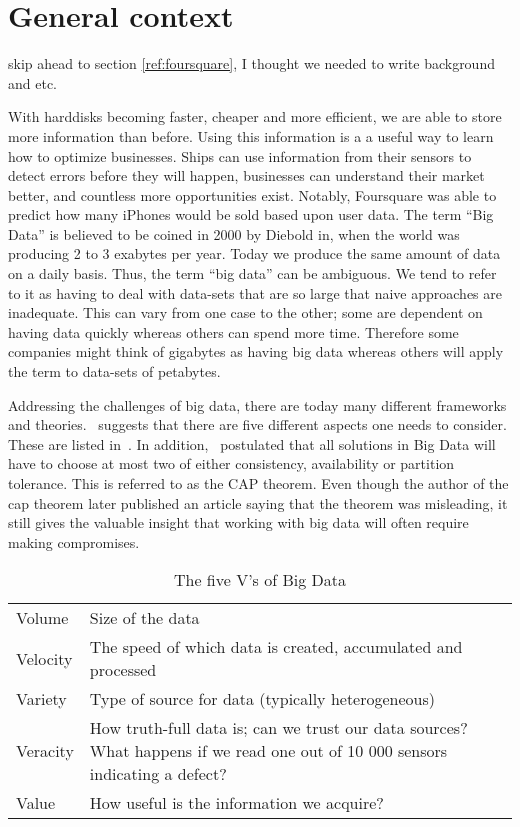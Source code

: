 \section{General context}
\huge skip ahead to section \cref{ref:foursquare}, I thought we needed to write background and etc.
\normalsize
\newline
{\color{blue}
With harddisks becoming faster, cheaper and more efficient, we are able to store more information than before. Using this information is a a useful way to learn how to optimize businesses. Ships can use information
from their sensors to detect errors before they will happen, businesses can understand their market better, and countless more opportunities exist. Notably, Foursquare was able to predict how many iPhones would be sold based upon user data\cite{predictFoursquare}. The term ``Big Data'' is believed to be coined in 2000 by Diebold in\cite{HistoryOfBigData}, when the world was producing 2 to 3 exabytes per year. Today we produce the same amount of data on a daily basis. Thus, the term ``big data'' can be ambiguous. We tend to refer to it as having to deal with data-sets that are so large that naive approaches are inadequate. This can vary from one case to the other; some are dependent on having data quickly whereas others can spend more time. Therefore some companies might think of gigabytes as having big data whereas others will apply the term to data-sets of petabytes. 

Addressing the challenges of big data, there are today many different frameworks and theories.~\cite{fundamentalsPensum} suggests that there are five different aspects one needs to consider. These are listed in~. In addition,~\cite{someone} postulated that
all solutions in Big Data will have to choose at most two of either consistency, availability or partition tolerance. This is referred to as the CAP theorem.  Even though the author of the cap theorem later published an article saying that the theorem was misleading, it still gives the valuable insight that working with big data will often require making compromises.


\begin{table}
\centering
\begin{tabular}{p{}|p{}}
        Volume & Size of the data  \\
        Velocity & The speed of which data is created, accumulated and processed \\
        Variety & Type of source for data (typically heterogeneous) \\
        Veracity & How truth-full data is; can we trust our data sources? What happens if we read one out of
        10 000 sensors indicating a defect?\\
        Value & How useful is the information we acquire? \\
    \end{tabular}
\caption{The five V's of Big Data}
\label{tab:fivev}
\end{table}


}
